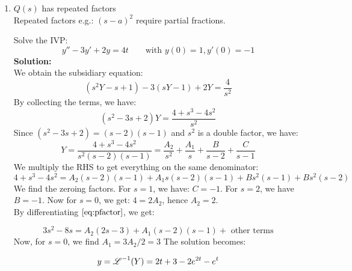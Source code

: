 \begin{enumerate}
\item $Q(s)$ has repeated factors\\
Repeated factors e.g.: $(s-a)^2$ require partial fractions.
\begin{exmp}{}
Solve the IVP:
\begin{equation*}
y''-3y'+2y=4t \qquad \text{with }y(0)=1,y'(0)=-1
\end{equation*}
\textbf{Solution:}\\
We obtain the subsidiary equation:
\begin{equation*}
(s^2Y-s+1)-3(sY-1)+2Y=\frac{4}{s^2}
\end{equation*}
By collecting the terms, we have:
\begin{equation*}
(s^2-3s+2)Y=\frac{4+s^3-4s^2}{s^2}
\end{equation*}
Since $(s^2-3s+2)=(s-2)(s-1)$ and $s^2$ is a double factor, we have:
\begin{equation*}
Y=\frac{4+s^3-4s^2}{s^2(s-2)(s-1)}=\frac{A_2}{s^2}+\frac{A_1}{s}+\frac{B}{s-2}+\frac{C}{s-1}
\end{equation*} 
We multiply the RHS to get everything on the same denominator:
\begin{equation}
4+s^3-4s^2=A_2(s-2)(s-1)+A_1s(s-2)(s-1)+Bs^2(s-1)+Bs^2(s-2)
\label{eq:pfactor}
\end{equation} 
We find the zeroing factors. For $s=1$, we have: $C=-1$. For $s=2$, we have $B=-1$. Now for $s=0$, we get: $4=2A_2$, hence $A_2=2$.\\
By differentiating $\ref{eq:pfactor}$, we get:

\begin{equation}
3s^2-8s=A_2(2s-3)+A_1(s-2)(s-1)+\text{ other terms}
\end{equation} 
Now, for $s=0$, we find $A_1=3A_2/2=3$
The solution becomes:

\begin{equation*}
y=\operatorname{\mathscr{L}}^{-1}(Y)=2 t+3-2e^{2t}-e^{t}
\end{equation*} 


\end{exmp}



\end{enumerate}





